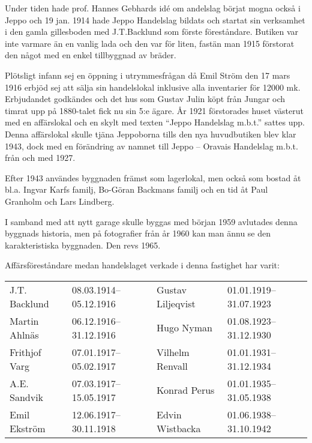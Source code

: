 Under tiden hade prof. Hannes Gebhards idé om andelslag börjat mogna också i Jeppo och 19 jan. 1914 hade Jeppo Handelslag bildats och startat sin verksamhet i den gamla gillesboden med J.T.Backlund som förste föreståndare. Butiken var inte varmare än en vanlig lada och den var för liten, fastän man 1915 förstorat den något med en enkel tillbyggnad av bräder.

Plötsligt infann sej en öppning i utrymmesfrågan då Emil Ström den 17 mars 1916 erbjöd sej att sälja sin handelslokal inklusive alla inventarier för 12000 mk. Erbjudandet godkändes och det hus som Gustav Julin köpt från Jungar och timrat upp på 1880-talet fick nu sin 5:e ägare. År 1921 förstorades huset västerut med en affärslokal och en skylt med texten ``Jeppo Handelslag m.b.t.'' sattes upp. Denna affärslokal skulle tjäna Jeppoborna tills den nya huvudbutiken blev klar 1943, dock med en förändring av namnet till Jeppo – Oravais Handelslag m.b.t. från och med  1927.


Efter 1943 användes byggnaden främst som lagerlokal, men också som bostad åt bl.a. Ingvar Karfs familj, Bo-Göran Backmans familj och en tid åt Paul Granholm och Lars Lindberg.

I samband med att nytt garage skulle byggas med början 1959 avlutades denna byggnads historia, men på fotografier från år 1960 kan man ännu se den karakteristiska byggnaden. Den revs 1965.

Affärsföreståndare medan handelslaget verkade i denna fastighet har varit:
\begin{center}
  \begin{tabular}{l l l l}
    \hline
    J.T. Backlund & 08.03.1914--05.12.1916 & Gustav Liljeqvist & 01.01.1919--31.07.1923 \\
    Martin Ahlnäs & 06.12.1916--31.12.1916 & Hugo Nyman & 01.08.1923--31.12.1930 \\
    Frithjof Varg & 07.01.1917--05.02.1917 & Vilhelm Renvall & 01.01.1931--31.12.1934 \\
    A.E. Sandvik & 07.03.1917--15.05.1917 & Konrad Perus & 01.01.1935--31.05.1938 \\
    Emil Ekström & 12.06.1917--30.11.1918 & Edvin Wistbacka & 01.06.1938--31.10.1942 \\ \hline
  \end{tabular}
\end{center}

